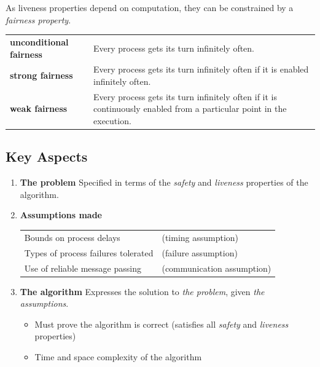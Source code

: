 As liveness properties depend on computation, they can be constrained by a \textit{fairness property}.
\\ \begin{tabular}{l p{}}
    \textbf{unconditional fairness} & Every process gets its turn infinitely often. \\
    \textbf{strong fairness} & Every process gets its turn infinitely often if it is enabled infinitely often. \\
    \textbf{weak fairness} & Every process gets its turn infinitely often if it is continuously enabled from a particular point in the execution. \\
\end{tabular}

\subsection{Key Aspects}
\begin{enumerate}
    \item {\textbf{The problem}
        Specified in terms of the \textit{safety} and \textit{liveness} properties of the algorithm.
    }
    \item {\textbf{Assumptions made}
        \\ \begin{tabular}{l l}
            Bounds on process delays & (timing assumption) \\
            Types of process failures tolerated & (failure assumption) \\
            Use of reliable message passing & (communication assumption) \\
        \end{tabular}
    }
    \item {\textbf{The algorithm}
        Expresses the solution to \textit{the problem}, given \textit{the assumptions}.
        \begin{itemize}
            \item Must prove the algorithm is correct (satisfies all \textit{safety} and \textit{liveness} properties)
            \item Time and space complexity of the algorithm
        \end{itemize}
    }
\end{enumerate}

